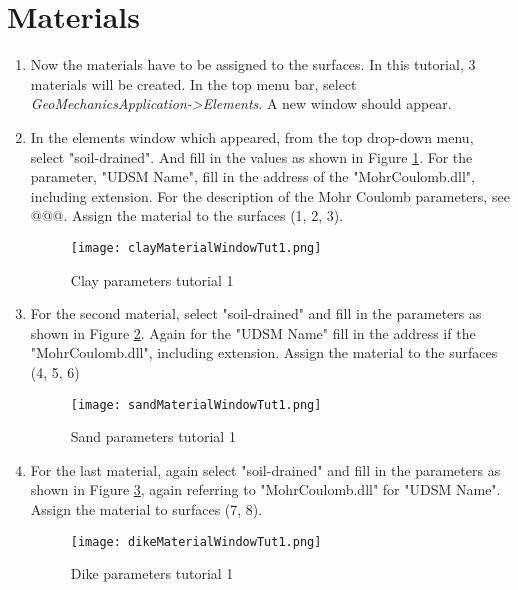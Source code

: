 \section{Materials}
\begin{enumerate}[resume]	
	\item Now the materials have to be assigned to the surfaces. In this tutorial, 3 materials will be created. In the top menu bar, select \textit{GeoMechanicsApplication->Elements}. A new window should appear.
	
	\item In the elements window which appeared, from the top drop-down menu, select "soil-drained". And fill in the values as shown in Figure \ref{fig:tut1_clay_mat}. For the parameter, "UDSM Name", fill in the address of the "MohrCoulomb.dll", including extension. For the description of the Mohr Coulomb parameters, see @@@. Assign the material to the surfaces (1, 2, 3).
	
	\begin{figure}[h!]		
		\texttt{[image: clayMaterialWindowTut1.png]}
		\caption{Clay parameters tutorial 1}
		\label{fig:tut1_clay_mat}
	\end{figure}
	
	\item For the second material, select "soil-drained" and fill in the parameters as shown in Figure \ref{fig:tut1_sand_mat}. Again for the "UDSM Name" fill in the address if the "MohrCoulomb.dll", including extension. Assign the material to the surfaces (4, 5, 6)
	
	\begin{figure}[h!]		
		\texttt{[image: sandMaterialWindowTut1.png]}
		\caption{Sand parameters tutorial 1}
		\label{fig:tut1_sand_mat}
	\end{figure}

	\item For the last material, again select "soil-drained" and fill in the parameters as shown in Figure \ref{fig:tut1_dike_mat}, again referring to "MohrCoulomb.dll" for "UDSM Name". Assign the material to surfaces (7, 8).
	
	\begin{figure}[h!]		
		\texttt{[image: dikeMaterialWindowTut1.png]}
		\caption{Dike parameters tutorial 1}
		\label{fig:tut1_dike_mat}
	\end{figure}
\end{enumerate}

